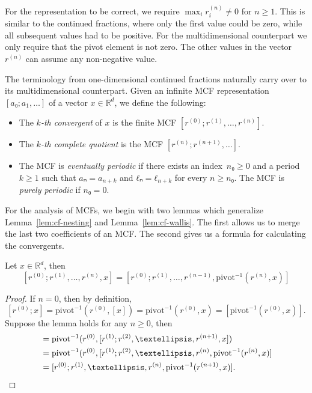 For the representation to be correct, we require $\max_i r_i^{(n)} ≠ 0$ for $n ≥ 1$.
This is similar to the continued fractions, where only the first value could be zero,
while all subsequent values had to be positive.
For the multidimensional counterpart we only require that the pivot element is not zero.
The other values in the vector $r^{(n)}$ can assume any non-negative value.

The terminology from one-dimensional continued fractions naturally carry over to its
multidimensional counterpart.
Given an infinite MCF representation~$[a₀; a_1, …]$ of a vector $x ∈ ℝ^d$, we define the following:

\begin{itemize}
  \item The \emph{$k$-th convergent} of $x$ is the finite MCF $[r^{(0)}; r^{(1)}, …, r^{(n)}]$.
  \item The \emph{$k$-th complete quotient} is the MCF $[r^{(n)}; r^{(n+1)}, …]$.
  \item The MCF is \emph{eventually periodic} if there exists an index~$n₀ ≥ 0$
    and a period~$k ≥ 1$ such that $aₙ = a_{n+k}$ and $ℓₙ = ℓ_{n+k}$
    for every $n ≥ n₀$.
    The MCF is \emph{purely periodic} if $n₀ = 0$.
\end{itemize}

For the analysis of MCFs,
we begin with two lemmas which generalize Lemma~\ref{lem:cf-nesting} and
Lemma~\vref{lem:cf-wallis}.
The first allows us to merge the last two coefficients of an MCF.
The second gives us a formula for calculating the convergents.

\begin{lemma}
  \label{lem:mdcf-nesting}
  Let $x ∈ ℝ^d$, then
  \[
    [r^{(0)}; r^{(1)}, …, r^{(n)}, x]
    = [r^{(0)}; r^{(1)}, …, r^{(n-1)}, \mathrm{pivot}^{-1}(r^{(n)}, x)]
  \]
\end{lemma}

\begin{proof}
  If $n = 0$, then by definition,
  \[
    [r^{(0)}; x] = \mathrm{pivot}^{-1}(r^{(0)}, [x]) = \mathrm{pivot}^{-1}(r^{(0)}, x) = [\mathrm{pivot}^{-1}(r^{(0)}, x)].
  \]
  Suppose the lemma holds for any $n ≥ 0$, then
  \begin{align*}
    [r^{(0)}; r^{(1)}, …, r^{(n+1)}, x]
    & = \mathrm{pivot}^{-1}(r^{(0)}, [r^{(1)}; r^{(2)}, …, r^{(n+1)}, x]) \\
    & = \mathrm{pivot}^{-1}(r^{(0)}, [r^{(1)}; r^{(2)}, …, r^{(n)}, \mathrm{pivot}^{-1}(r^{(n)}, x)] \\
    & = [r^{(0)}; r^{(1)}, …, r^{(n)}, \mathrm{pivot}^{-1}(r^{(n+1)}, x)]. \qedhere
  \end{align*}
\end{proof}

